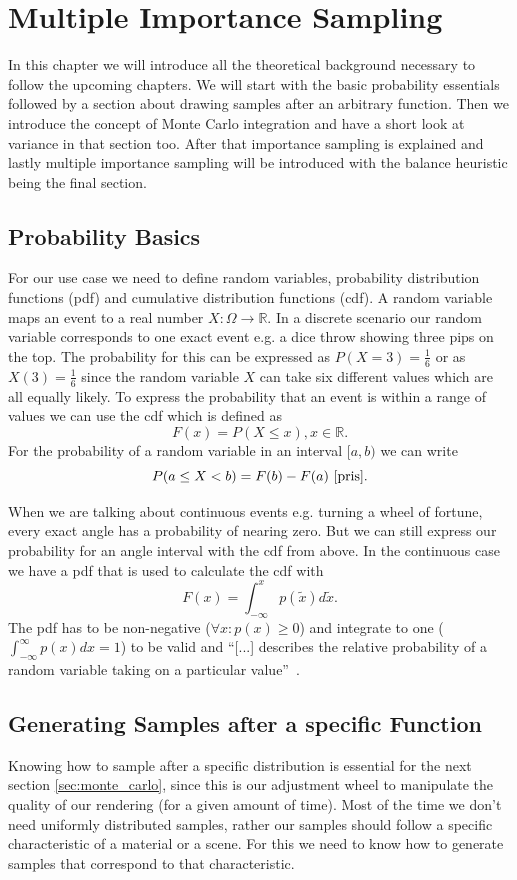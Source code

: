 \chapter{Multiple Importance Sampling}
\label{ch:mis}
In this chapter we will introduce all the theoretical background necessary to follow the upcoming chapters.
We will start with the basic probability essentials followed by a section about drawing samples after an arbitrary function.
Then we introduce the concept of Monte Carlo integration
and have a short look at variance in that section too.
After that importance sampling is explained
and lastly multiple importance sampling will be introduced with the balance heuristic being the final section.


\section{Probability Basics}
\label{sec:probability_basics}
For our use case we need to define random variables, probability distribution functions (pdf) and cumulative distribution functions (cdf).
A random variable maps an event to a real number $ X: \Omega \to \mathbb{R} $.
In a discrete scenario our random variable corresponds to one exact event e.g. a dice throw showing three pips on the top.
The probability for this can be expressed as $ P(X = 3) = \frac{1}{6} $ or as $ X(3) = \frac{1}{6} $
since the random variable $ X $ can take six different values which are all equally likely.
To express the probability that an event is within a range of values we can use the cdf
which is defined as $$ F(x) = P(X \leq x), x \in \mathbb{R}. $$
For the probability of a random variable in an interval $ [a, b) $ we can write $$ P(a \leq X < b) = F(b) - F(a)~\cite{pris}. $$

When we are talking about continuous events e.g. turning a wheel of fortune, every exact angle has a probability of nearing zero.
But we can still express our probability for an angle interval with the cdf from above.
In the continuous case we have a pdf that is used to calculate the cdf with $$ F(x) = \int_{-\infty}^x p(\tilde{x}) d\tilde{x}. $$
The pdf has to be non-negative ($ \forall x: p(x) \geq 0 $) and integrate to one ($ \int_{-\infty}^{\infty} p(x) dx = 1$) to be valid and
\enquote{[...] describes the relative probability of a random variable taking on a particular value}~\cite[Chapter~13.1]{pbr-book}.


\section{Generating Samples after a specific Function}
\label{sec:sample_generation}
Knowing how to sample after a specific distribution is essential for the next section \ref{sec:monte_carlo},
since this is our adjustment wheel to manipulate the quality of our rendering (for a given amount of time).
Most of the time we don't need uniformly distributed samples,
rather our samples should follow a specific characteristic of a material or a scene.
For this we need to know how to generate samples that correspond to that characteristic.

